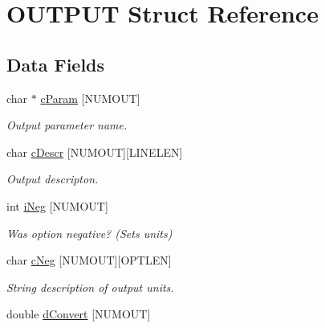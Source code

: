 \hypertarget{struct_o_u_t_p_u_t}{}\section{O\+U\+T\+P\+U\+T Struct Reference}
\label{struct_o_u_t_p_u_t}
\subsection*{Data Fields}
\begin{DoxyCompactItemize}
\item 
\hypertarget{struct_o_u_t_p_u_t_ad476065c494bcd6240efb554f7f515a8}{}char $\ast$ \hyperlink{struct_o_u_t_p_u_t_ad476065c494bcd6240efb554f7f515a8}{c\+Param} \mbox{[}N\+U\+M\+O\+U\+T\mbox{]}\label{struct_o_u_t_p_u_t_ad476065c494bcd6240efb554f7f515a8}

\begin{DoxyCompactList}\small\item\em Output parameter name. \end{DoxyCompactList}\item 
\hypertarget{struct_o_u_t_p_u_t_a9d5537ae175e241f099c97b893f91b41}{}char \hyperlink{struct_o_u_t_p_u_t_a9d5537ae175e241f099c97b893f91b41}{c\+Descr} \mbox{[}N\+U\+M\+O\+U\+T\mbox{]}\mbox{[}L\+I\+N\+E\+L\+E\+N\mbox{]}\label{struct_o_u_t_p_u_t_a9d5537ae175e241f099c97b893f91b41}

\begin{DoxyCompactList}\small\item\em Output descripton. \end{DoxyCompactList}\item 
\hypertarget{struct_o_u_t_p_u_t_a55d2c908377beaddd5bb33ca54454ba2}{}int \hyperlink{struct_o_u_t_p_u_t_a55d2c908377beaddd5bb33ca54454ba2}{i\+Neg} \mbox{[}N\+U\+M\+O\+U\+T\mbox{]}\label{struct_o_u_t_p_u_t_a55d2c908377beaddd5bb33ca54454ba2}

\begin{DoxyCompactList}\small\item\em Was option negative? (Sets units) \end{DoxyCompactList}\item 
\hypertarget{struct_o_u_t_p_u_t_a36ce987f80591eee5aa7b5adf7c1936b}{}char \hyperlink{struct_o_u_t_p_u_t_a36ce987f80591eee5aa7b5adf7c1936b}{c\+Neg} \mbox{[}N\+U\+M\+O\+U\+T\mbox{]}\mbox{[}O\+P\+T\+L\+E\+N\mbox{]}\label{struct_o_u_t_p_u_t_a36ce987f80591eee5aa7b5adf7c1936b}

\begin{DoxyCompactList}\small\item\em String description of output units. \end{DoxyCompactList}\item 
\hypertarget{struct_o_u_t_p_u_t_ac957bbc6739f305ae5d454a6cf1b14d3}{}double \hyperlink{struct_o_u_t_p_u_t_ac957bbc6739f305ae5d454a6cf1b14d3}{d\+Convert} \mbox{[}N\+U\+M\+O\+U\+T\mbox{]}\label{struct_o_u_t_p_u_t_ac957bbc6739f305ae5d454a6cf1b14d3}


\end{DoxyCompactItemize}
